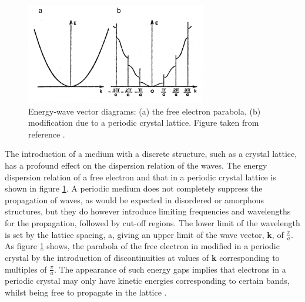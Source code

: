 \begin{figure}[h!]
  \centering
    \includegraphics[width=0.7\textwidth]{figures/bs1.png}
    \caption{Energy-wave vector diagrams: (a) the free electron parabola, (b) modification due to a periodic crystal lattice. Figure taken from reference .}
  \label{bs1}
\end{figure}

The introduction of a medium with a discrete structure, such as a crystal lattice, has a profound effect on the dispersion relation of the waves. The energy dispersion relation of a free electron and that in a periodic crystal lattice is shown in figure \ref{bs1}. A periodic medium does not completely suppress the propagation of waves, as would be expected  in disordered or amorphous structures, but they do however introduce limiting frequencies and wavelengths for the propagation, followed by cut-off regions. The lower limit of the wavelength is set by the lattice spacing, a, giving an upper limit of the wave vector, \textbf{k}, of $\frac{\pi}{a}$. As figure \ref{bs1} shows, the parabola of the free electron in modified in a periodic crystal by the introduction of discontinuities at values of \textbf{k} corresponding to multiples of $\frac{\pi}{a}$. The appearance of such energy gaps implies that electrons in a periodic crystal may only have kinetic energies corresponding to certain bands, whilst being free to propagate in the lattice \cite{small_semiconductor2}.\\

